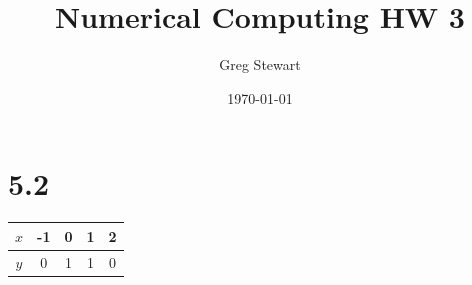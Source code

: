 \documentclass{article}
\title{Numerical Computing HW 3}
\author{Greg Stewart}
\date{\today}
\begin{document}
\maketitle

\section*{5.2}

\begin{table}[h!]
  \centering
  \begin{tabular} {c | c c c c }
    $x$ & -1 & 0 & 1 & 2 \\ 
    \hline  
    $y$ & 0 & 1 & 1 & 0 \\
  \end{tabular}
\end{table}
\end{document}
